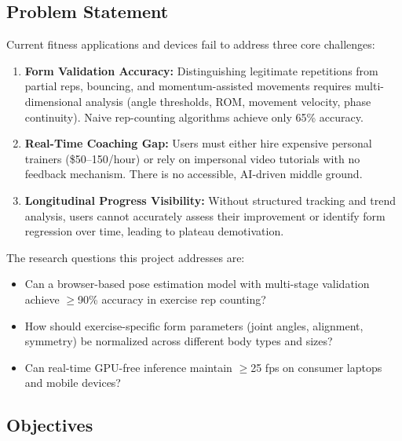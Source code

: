 \documentclass[12pt,a4paper]{article}
\begin{document}
\subsection{Problem Statement}

Current fitness applications and devices fail to address three core challenges:

\begin{enumerate}[noitemsep, topsep=2pt]
  \item \textbf{Form Validation Accuracy:} Distinguishing legitimate repetitions 
        from partial reps, bouncing, and momentum-assisted movements requires 
        multi-dimensional analysis (angle thresholds, ROM, movement velocity, 
        phase continuity). Naive rep-counting algorithms achieve only 65\% accuracy.
  
  \item \textbf{Real-Time Coaching Gap:} Users must either hire expensive 
        personal trainers (\$50--150/hour) or rely on impersonal video tutorials 
        with no feedback mechanism. There is no accessible, AI-driven middle ground.
  
  \item \textbf{Longitudinal Progress Visibility:} Without structured tracking 
        and trend analysis, users cannot accurately assess their improvement or 
        identify form regression over time, leading to plateau demotivation.
\end{enumerate}

The research questions this project addresses are:

\begin{itemize}[noitemsep, topsep=2pt]
  \item Can a browser-based pose estimation model with multi-stage validation 
        achieve $\geq$90\% accuracy in exercise rep counting?
  
  \item How should exercise-specific form parameters (joint angles, alignment, 
        symmetry) be normalized across different body types and sizes?
  
  \item Can real-time GPU-free inference maintain $\geq$25 fps on consumer 
        laptops and mobile devices?
\end{itemize}

\subsection{Objectives}
\end{document}
